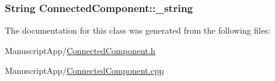 \hypertarget{class_connected_component_a3d7c59ca80f6304b1f07a0e196a45bc1}{
\subsubsection[{\+\_\+string}]{\setlength{\rightskip}{0pt plus 5cm}String Connected\+Component\+::\+\_\+string\hspace{0.3cm}{\ttfamily [protected]}}}\label{class_connected_component_a3d7c59ca80f6304b1f07a0e196a45bc1}


The documentation for this class was generated from the following files\+:\begin{DoxyCompactItemize}
\item 
Manuscript\+App/\hyperlink{_connected_component_8h}{Connected\+Component.\+h}\item 
Manuscript\+App/\hyperlink{_connected_component_8cpp}{Connected\+Component.\+cpp}\end{DoxyCompactItemize}
